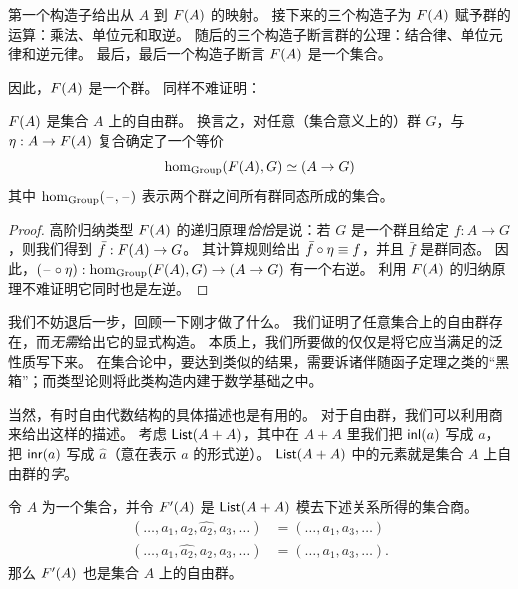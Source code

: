 第一个构造子给出从 $A$ 到 $F(A)$ 的映射。
接下来的三个构造子为 $F(A)$ 赋予群的运算：乘法、单位元和取逆。
随后的三个构造子断言群的公理：结合律、单位元律和逆元律。
最后，最后一个构造子断言 $F(A)$ 是一个集合。

因此，$F(A)$ 是一个群。
同样不难证明：

\begin{thm}
  $F(A)$ 是集合 $A$ 上的自由群。
  换言之，对任意（集合意义上的）群 $G$，与 $\eta:A\to F(A)$ 复合确定了一个等价
  \[ \hom_{\mathrm{Group}}(F(A),G) \simeq (A\to G) \]
  其中 $\hom_{\mathrm{Group}}(\mathord{\hspace{1pt}\text{--}\hspace{1pt}},\mathord{\hspace{1pt}\text{--}\hspace{1pt}})$ 表示两个群之间所有群同态所成的集合。
\end{thm}

\begin{proof}
  高阶归纳类型 $F(A)$ 的递归原理\emph{恰恰}是说：若 $G$ 是一个群且给定 $f:A\to G$，则我们得到 $\bar{f}:F(A) \to G$。
  其计算规则给出 $\bar{f}\circ \eta \equiv f$，并且 $\bar f$ 是群同态。
  因此，$(\mathord{\hspace{1pt}\text{--}\hspace{1pt}}\circ \eta) :  \hom_{\mathrm{Group}}(F(A),G) \to (A\to G)$ 有一个右逆。
  利用 $F(A)$ 的归纳原理不难证明它同时也是左逆。
\end{proof}

我们不妨退后一步，回顾一下刚才做了什么。
我们证明了任意集合上的自由群存在，而\emph{无需}给出它的显式构造。
本质上，我们所要做的仅仅是将它应当满足的泛性质写下来。
在集合论中，要达到类似的结果，需要诉诸伴随函子定理之类的``黑箱''；而类型论则将此类构造内建于数学基础之中。

当然，有时自由代数结构的具体描述也是有用的。
对于自由群，我们可以利用商来给出这样的描述。
考虑 $\mathsf{List}(A+A)$，其中在 $A+A$ 里我们把 ${\mathsf{inl}}(a)$ 写成 $a$，把 ${\mathsf{inr}}(a)$ 写成 $\hat{a}$（意在表示 $a$ 的形式逆）。
$\mathsf{List}(A+A)$ 中的元素就是集合 $A$ 上自由群的\emph{字}。

\begin{thm}
  令 $A$ 为一个集合，并令 $F'(A)$ 是 $\mathsf{List}(A+A)$ 模去下述关系所得的集合商。
  \begin{align*}
    (\dots,a_1,a_2,\widehat{a_2},a_3,\dots) &=
    (\dots,a_1,a_3,\dots)\\
    (\dots,a_1,\widehat{a_2},a_2,a_3,\dots) &=
    (\dots,a_1,a_3,\dots).
  \end{align*}
  那么 $F'(A)$ 也是集合 $A$ 上的自由群。
\end{thm}

